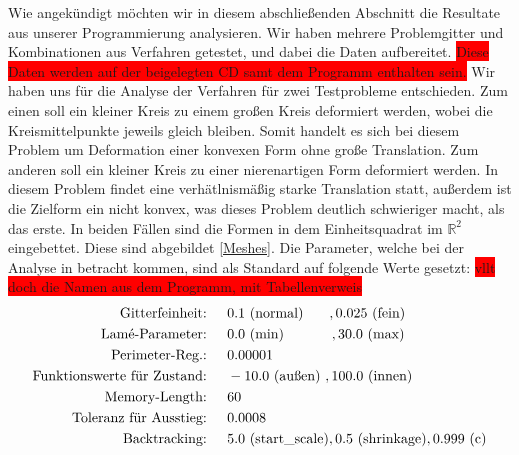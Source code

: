 Wie angekündigt möchten wir in diesem abschließenden Abschnitt die Resultate aus unserer Programmierung analysieren. Wir haben mehrere Problemgitter und Kombinationen aus Verfahren getestet, und dabei die Daten aufbereitet. \colorbox{red}{Diese Daten werden auf der beigelegten CD samt dem Programm enthalten sein.}
Wir haben uns für die Analyse der Verfahren für zwei Testprobleme entschieden. Zum einen soll ein kleiner Kreis zu einem großen Kreis deformiert werden, wobei die Kreismittelpunkte jeweils gleich bleiben. Somit handelt es sich bei diesem Problem um Deformation einer konvexen Form ohne große Translation. Zum anderen soll ein kleiner Kreis zu einer nierenartigen Form deformiert werden. In diesem Problem findet eine verhätlnismäßig starke Translation statt, außerdem ist die Zielform ein nicht konvex, was dieses Problem deutlich schwieriger macht, als das erste. In beiden Fällen sind die Formen in dem Einheitsquadrat im $\mathbb{R}^2$ eingebettet. Diese sind abgebildet \ref{Meshes}. 
Die Parameter, welche bei der Analyse in betracht kommen, sind als Standard auf folgende Werte gesetzt:
\colorbox{red}{vllt doch die Namen aus dem Programm, mit Tabellenverweis}
\begin{align*}
\text{Gitterfeinheit: \hspace{0.2cm} }& 0.1 \text{ (normal)} \hspace{0.65cm} ,0.025 \text{ (fein)} \\
\text{Lamé-Parameter: \hspace{0.2cm} }& 0.0 \text{ (min)} \hspace{1.2cm}  ,30.0 \text{ (max)} \\
\text{Perimeter-Reg.: \hspace{0.2cm} }& 0.00001 \\
\text{Funktionswerte für Zustand: \hspace{0.2cm} }& -10.0 \text{ (außen) },  100.0 \text{ (innen)} \\
\text{Memory-Length: \hspace{0.2cm} }& 60 \\
\text{Toleranz für Ausstieg: \hspace{0.2cm} }& 0.0008 \\
\text{Backtracking: \hspace{0.2cm} }& 5.0 \text{ (start\_scale)}, 0.5 \text{ (shrinkage)}, 0.999 \text{ (c)}
\end{align*}

